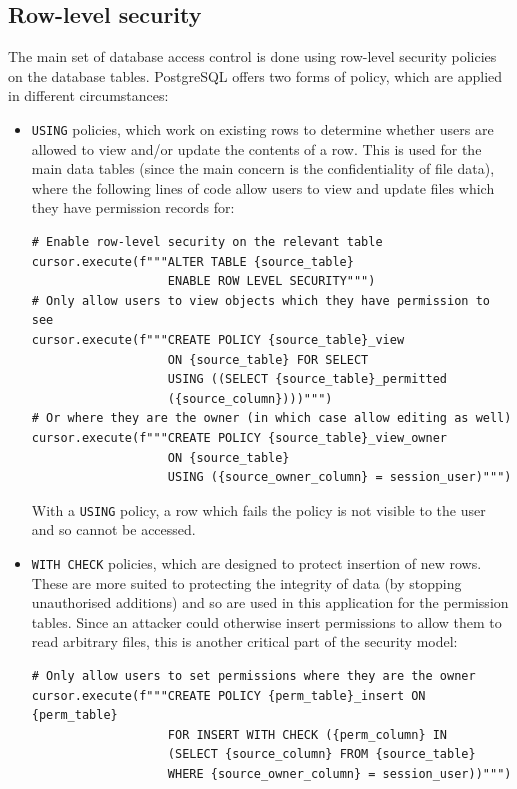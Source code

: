 \documentclass[12pt]{report}
\begin{document}
\subsection{Row-level security}
The main set of database access control is done using row-level security policies on the database tables. PostgreSQL offers two forms of policy, which are applied in different circumstances\cite{postgres-policy}:
\begin{itemize}
\item
  \texttt{USING} policies, which work on existing rows to determine whether users are allowed to view and/or update the contents of a row. This is used for the main data tables (since the main concern is the confidentiality of file data), where the following lines of code allow users to view and update files which they have permission records for:

\begin{verbatim}
# Enable row-level security on the relevant table
cursor.execute(f"""ALTER TABLE {source_table}
                   ENABLE ROW LEVEL SECURITY""")
# Only allow users to view objects which they have permission to see
cursor.execute(f"""CREATE POLICY {source_table}_view
                   ON {source_table} FOR SELECT
                   USING ((SELECT {source_table}_permitted
                   ({source_column})))""")
# Or where they are the owner (in which case allow editing as well)
cursor.execute(f"""CREATE POLICY {source_table}_view_owner
                   ON {source_table}
                   USING ({source_owner_column} = session_user)""")
\end{verbatim}

  With a \texttt{USING} policy, a row which fails the policy is not visible to the user and so cannot be accessed.

\item
  \texttt{WITH CHECK} policies, which are designed to protect insertion of new rows. These are more suited to protecting the integrity of data (by stopping unauthorised additions) and so are used in this application for the permission tables. Since an attacker could otherwise insert permissions to allow them to read arbitrary files, this is another critical part of the security model:

\begin{verbatim}
# Only allow users to set permissions where they are the owner
cursor.execute(f"""CREATE POLICY {perm_table}_insert ON {perm_table}
                   FOR INSERT WITH CHECK ({perm_column} IN
                   (SELECT {source_column} FROM {source_table}
                   WHERE {source_owner_column} = session_user))""")
\end{verbatim}
\end{itemize}
\end{document}
